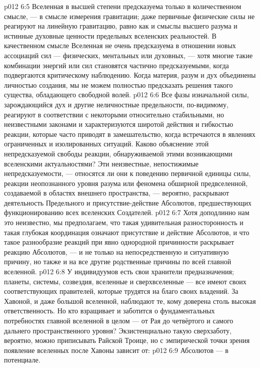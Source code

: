 \vs p012 6:5 Вселенная в высшей степени предсказуема только в количественном смысле, --- в смысле измерения гравитации; даже первичные физические силы не реагируют на линейную гравитацию, равно как и смыслы высшего разума и истинные духовные ценности предельных вселенских реальностей. В качественном смысле Вселенная не очень предсказуема в отношении новых ассоциаций сил --- физических, ментальных или духовных, --- хотя многие такие комбинации энергий или сил становятся частично предсказуемыми, когда подвергаются критическому наблюдению. Когда материя, разум и дух объединены личностью создания, мы не можем полностью предсказать решения такого существа, обладающего свободной волей.
\vs p012 6:6 \pc Все фазы изначальной силы, зарождающийся дух и другие неличностные предельности, по\hyp{}видимому, реагируют в соответствии с некоторыми относительно стабильными, но неизвестными законами и характеризуются широтой действия и гибкостью реакции, которые часто приводят в замешательство, когда встречаются в явлениях ограниченных и изолированных ситуаций. Каково объяснение этой непредсказуемой свободы реакции, обнаруживаемой этими возникающими вселенскими актуальностями? Эти неизвестные, непостижимые непредсказуемости, --- относятся ли они к поведению первичной единицы силы, реакции неопознанного уровня разума или феномена обширной предвселенной, создаваемой в областях внешнего пространства, --- вероятно, раскрывают деятельность Предельного и присутствие\hyp{}действие Абсолютов, предшествующих функционированию всех вселенских Создателей.
\vs p012 6:7 Хотя доподлинно нам это неизвестно, мы предполагаем, что такая удивительная разносторонность и такая глубокая координация означают присутствие и действие Абсолютов, и что такое разнообразие реакций при явно однородной причинности раскрывает реакцию Абсолютов, --- и не только на непосредственную и ситуативную причину, но также и на все другие родственные причины по всей главной вселенной.
\vs p012 6:8 \pc У индивидуумов есть свои хранители предназначения; планеты, системы, созвездия, вселенные и сверхвселенные --- все имеют своих соответствующих правителей, которые трудятся на благо своих владений. За Хавоной, и даже большой вселенной, наблюдают те, кому доверена столь высокая ответственность. Но кто взращивает и заботится о фундаментальных потребностях главной вселенной в целом --- от Рая до четвёртого и самого дальнего пространственного уровня? Экзистенциально такую сверхзаботу, вероятно, можно приписывать Райской Троице, но с эмпирической точки зрения появление вселенных после Хавоны зависит от:
\vs p012 6:9 Абсолютов --- в потенциале.
